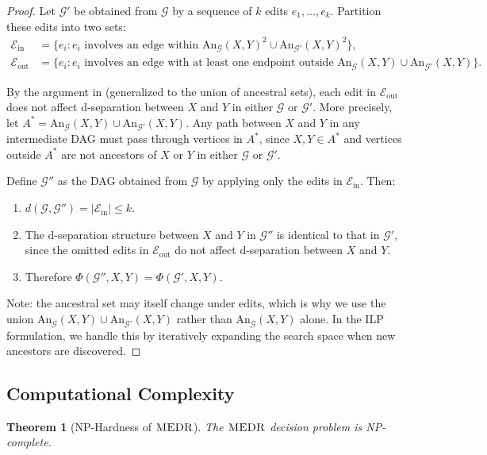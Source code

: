 \documentclass[11pt,a4paper]{article}
\newtheorem{theorem}{Theorem}[section]
\theoremstyle{definition}
\theoremstyle{remark}
\newcommand{\DAG}{\mathcal{G}}
\newcommand{\An}{\mathrm{An}}
\newcommand{\editdist}{d}
\newcommand{\MEDR}{\textsc{MEDR}}
\newcommand{\Phi}{\varPhi}
\begin{document}
\begin{proof}
Let $\DAG'$ be obtained from $\DAG$ by a sequence of $k$ edits $e_1, \ldots, e_k$.
Partition these edits into two sets:
\begin{align*}
  \mathcal{E}_{\mathrm{in}} &= \{e_i : e_i \text{ involves an edge within }
    \An_\DAG(X,Y)^2 \cup \An_{\DAG'}(X,Y)^2\}, \\
  \mathcal{E}_{\mathrm{out}} &= \{e_i : e_i \text{ involves an edge with at least one
    endpoint outside } \An_\DAG(X,Y) \cup \An_{\DAG'}(X,Y)\}.
\end{align*}

By the argument in  (generalized to the union of ancestral sets),
each edit in $\mathcal{E}_{\mathrm{out}}$ does not affect d-separation between $X$ and
$Y$ in either $\DAG$ or $\DAG'$. More precisely, let $A^* = \An_\DAG(X,Y) \cup
\An_{\DAG'}(X,Y)$. Any path between $X$ and $Y$ in any intermediate DAG must pass
through vertices in $A^*$, since $X, Y \in A^*$ and vertices outside $A^*$ are not
ancestors of $X$ or $Y$ in either $\DAG$ or $\DAG'$.

Define $\DAG''$ as the DAG obtained from $\DAG$ by applying only the edits in
$\mathcal{E}_{\mathrm{in}}$. Then:
\begin{enumerate}
  \item $\editdist(\DAG, \DAG'') = |\mathcal{E}_{\mathrm{in}}| \leq k$.
  \item The d-separation structure between $X$ and $Y$ in $\DAG''$ is identical to that
    in $\DAG'$, since the omitted edits in $\mathcal{E}_{\mathrm{out}}$ do not affect
    d-separation between $X$ and $Y$.
  \item Therefore $\Phi(\DAG'', X, Y) = \Phi(\DAG', X, Y)$.
\end{enumerate}

\noindent Note: the ancestral set may itself change under edits, which is why we use
the union $\An_\DAG(X,Y) \cup \An_{\DAG'}(X,Y)$ rather than $\An_\DAG(X,Y)$ alone.
In the ILP formulation, we handle this by iteratively expanding the search space
when new ancestors are discovered.
\end{proof}


\subsection{Computational Complexity}

\begin{theorem}[NP-Hardness of $\MEDR$]\label{thm:np_hard}
The $\MEDR$ decision problem is NP-complete.
\end{theorem}
\end{document}
